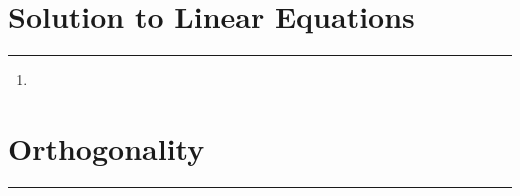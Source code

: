 \documentclass[
11pt, %
a4paper, %
oneside, %
headinclude,footinclude, %
BCOR5mm, %
]{scrartcl}
\begin{document}
\newpage

\section{Solution to Linear Equations}
\hrule
\vspace{0.5cm}

\begin{enumerate}
	\item 
\end{enumerate}

\newpage
\section{Orthogonality}
\hrule
\vspace{0.5cm}
\end{document}
